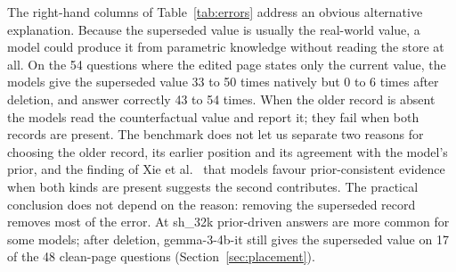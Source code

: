 \documentclass[journal=jcisd8,manuscript=article]{achemso}
\newcommand{\sub}[1]{\textsf{sh\_#1}}                    %
\begin{document}
\begin{table}[H]\centering
\caption{Native errors on the 74 conflicted questions of \sub{6k}, and a within-question control. ``Clean page'': the 54 conflicted questions for which the deletion plan removes every superseded version of the queried key and keeps the newest, so the edited page states only the current value. The set is fixed by the plan and is identical for all models.}
\label{tab:errors}
\end{table}

The right-hand columns of Table~\ref{tab:errors} address an obvious alternative explanation. Because the superseded value is usually the real-world value, a model could produce it from parametric knowledge without reading the store at all. On the 54 questions where the edited page states only the current value, the models give the superseded value 33 to 50 times natively but 0 to 6 times after deletion, and answer correctly 43 to 54 times. When the older record is absent the models read the counterfactual value and report it; they fail when both records are present. The benchmark does not let us separate two reasons for choosing the older record, its earlier position and its agreement with the model's prior, and the finding of Xie et al.~\cite{xie2024chameleon} that models favour prior-consistent evidence when both kinds are present suggests the second contributes. The practical conclusion does not depend on the reason: removing the superseded record removes most of the error. At \sub{32k} prior-driven answers are more common for some models; after deletion, gemma-3-4b-it still gives the superseded value on 17 of the 48 clean-page questions (Section~\ref{sec:placement}).
\end{document}
